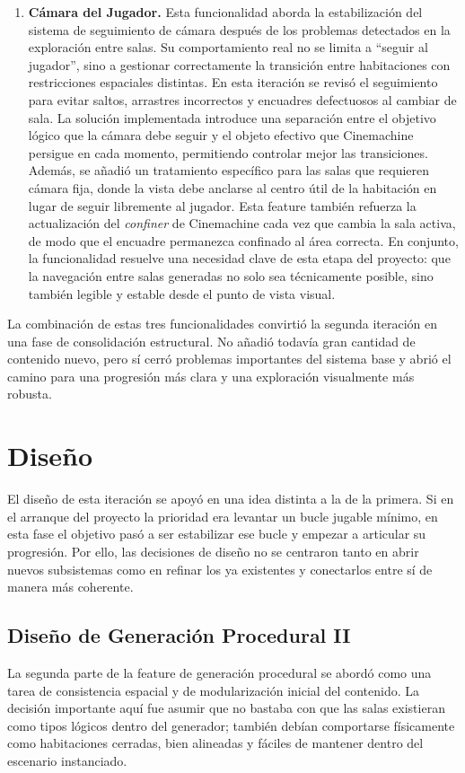 \begin{enumerate}
\item \textbf{Cámara del Jugador.} Esta funcionalidad aborda la estabilización del sistema de
seguimiento de cámara después de los problemas detectados en la exploración entre salas. Su
comportamiento real no se limita a ``seguir al jugador'', sino a gestionar correctamente la
transición entre habitaciones con restricciones espaciales distintas. En esta iteración se
revisó el seguimiento para evitar saltos, arrastres incorrectos y encuadres defectuosos al
cambiar de sala. La solución implementada introduce una separación entre el objetivo lógico
que la cámara debe seguir y el objeto efectivo que Cinemachine persigue en cada momento,
permitiendo controlar mejor las transiciones. Además, se añadió un tratamiento específico
para las salas que requieren cámara fija, donde la vista debe anclarse al centro útil de la
habitación en lugar de seguir libremente al jugador. Esta feature también refuerza la
actualización del \textit{confiner} de Cinemachine cada vez que cambia la sala activa, de
modo que el encuadre permanezca confinado al área correcta. En conjunto, la funcionalidad
resuelve una necesidad clave de esta etapa del proyecto: que la navegación entre salas
generadas no solo sea técnicamente posible, sino también legible y estable desde el punto
de vista visual.

\end{enumerate}

La combinación de estas tres funcionalidades convirtió la segunda iteración en una fase de
consolidación estructural. No añadió todavía gran cantidad de contenido nuevo, pero sí
cerró problemas importantes del sistema base y abrió el camino para una progresión más
clara y una exploración visualmente más robusta.

\section{Diseño}
El diseño de esta iteración se apoyó en una idea distinta a la de la primera. Si en el
arranque del proyecto la prioridad era levantar un bucle jugable mínimo, en esta fase el
objetivo pasó a ser estabilizar ese bucle y empezar a articular su progresión. Por ello,
las decisiones de diseño no se centraron tanto en abrir nuevos subsistemas como en refinar
los ya existentes y conectarlos entre sí de manera más coherente.

\subsection{Diseño de Generación Procedural II}
La segunda parte de la feature de generación procedural se abordó como una tarea de
consistencia espacial y de modularización inicial del contenido. La decisión importante aquí
fue asumir que no bastaba con que las salas existieran como tipos lógicos dentro del
generador; también debían comportarse físicamente como habitaciones cerradas, bien
alineadas y fáciles de mantener dentro del escenario instanciado.

